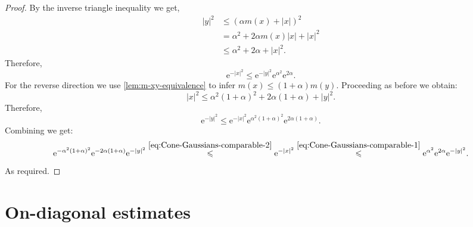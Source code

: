 \documentclass[a4paper,oneside,10pt]{amsproc}
\theoremstyle{plain}
\theoremstyle{remark}
\theoremstyle{definition}
\renewcommand{\leq}{\leqslant}
\renewcommand{\leq}{\leqslant}
\newcommand{\e}{\mathrm{e}} %
\renewcommand{\leq}{\leqslant}%
\begin{document}
\begin{proof}
  By the inverse triangle inequality we get, 
  \begin{align*}
    |y|^2 &\leq (\alpha m(x) + |x|)^2\\
    &= \alpha^2 + 2 \alpha m(x) |x| + |x|^2\\
    &\leq \alpha^2 + 2 \alpha + |x|^2.
  \end{align*}
  Therefore,
  \begin{equation}
    \label{eq:Cone-Gaussians-comparable-1}
    \e^{-|x|^2} \leq \e^{-|y|^2} \e^{\alpha^2} \e^{2\alpha}.
  \end{equation}
  For the reverse direction we use
  \autoref{lem:m-xy-equivalence} to infer $m(x) \leq (1 + \alpha)
  m(y)$. Proceeding as before we obtain: 
  \begin{equation*}
    |x|^2 \leq \alpha^2 (1 + \alpha)^2 + 2 \alpha (1 + \alpha) + |y|^2.
  \end{equation*}
  Therefore,
  \begin{equation}
    \label{eq:Cone-Gaussians-comparable-2}
    \e^{-|y|^2} \leq \e^{-|x|^2} \e^{\alpha^2 (1 + \alpha)^2} \e^{2
      \alpha (1 + \alpha)}.
  \end{equation}
  Combining we get:
  \begin{equation*}
    \e^{-\alpha^2(1 + \alpha)^2} \e^{-2\alpha(1 + \alpha)} \e^{-|y|^2}
    \overset{\eqref{eq:Cone-Gaussians-comparable-2}}{\leq} \e^{-|x|^2}
    \overset{\eqref{eq:Cone-Gaussians-comparable-1}}{\leq}
    \e^{\alpha^2} \e^{2\alpha} \e^{-|y|^2}.
  \end{equation*}
  As required.
\end{proof}

\section{On-diagonal estimates}
\end{document}
